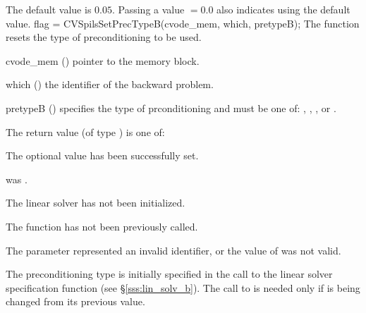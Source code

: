 {
  The default value is $0.05$.
  Passing a value $ = 0.0$ also indicates using the default value.
}
{
  flag = CVSpilsSetPrecTypeB(cvode\_mem, which, pretypeB);
}
{
  The function  resets the type
  of preconditioning to be used.
}
{
  \begin{args}
  \item[cvode\_mem] ()
    pointer to the {\cvodes} memory block.
  \item[which] ()
    the identifier of the backward problem.
  \item[pretypeB] ()
    specifies the type of prconditioning and must be one of:
    , , , or .
  \end{args}
}
{
  The return value  (of type ) is one of:
  \begin{args}
  \item[\Id{CVSPILS\_SUCCESS}] 
    The optional value has been successfully set.
  \item[\Id{CVSPILS\_MEM\_NULL}]
     was .
  \item[\Id{CVSPILS\_LMEM\_NULL}]
    The {\cvspils} linear solver has not been initialized.
  \item[\Id{CVSPILS\_NO\_ADJ}]
    The function  has not been previously called.
  \item[\Id{CVSPILS\_ILL\_INPUT}]
    The parameter  represented an invalid identifier, or
    the value of  was not valid.
  \end{args}
}
{
  The preconditioning type is initially specified in the call
  to the linear solver specification function (see \S\ref{sss:lin_solv_b}). 
  The call to  is needed only if  is being
  changed from its previous value.
}

